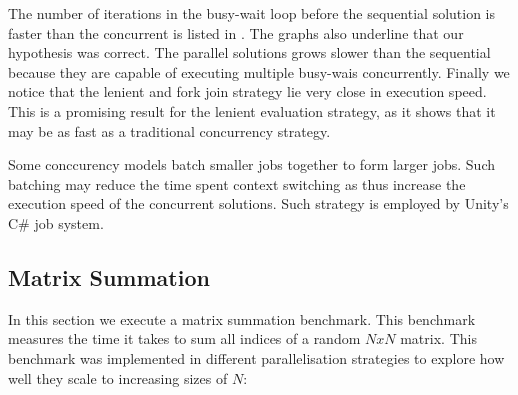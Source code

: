 \newcommand{\workBiasSymbolics}{\symbolic{Work Bias (iterations),134217728,67108864,33554432,16777216,8388608,4194304,2097152,1048576,524288,262144,131072,65536,32768,16384,8192,4096,2048,1024}}


The number of iterations in the busy-wait loop before the sequential solution is faster than the concurrent is listed in . The graphs also underline that our hypothesis was correct. The parallel solutions grows slower than the sequential because they are capable of executing multiple busy-wais concurrently. Finally we notice that the lenient and fork join strategy lie very close in execution speed. This is a promising result for the lenient evaluation strategy, as it shows that it may be as fast as a traditional concurrency strategy.

Some conccurency models batch smaller jobs together to form larger jobs\needcite. Such batching may reduce the time spent context switching as thus increase the execution speed of the concurrent solutions. Such strategy is employed by Unity's C\# job system\cite{unity:csharp:job:system}.

\subsection{Matrix Summation}
In this section we execute a matrix summation benchmark. This benchmark measures the time it takes to sum all indices of a random $N x N$ matrix. This benchmark was implemented in different parallelisation strategies to explore how well they scale to increasing sizes of $N$:

